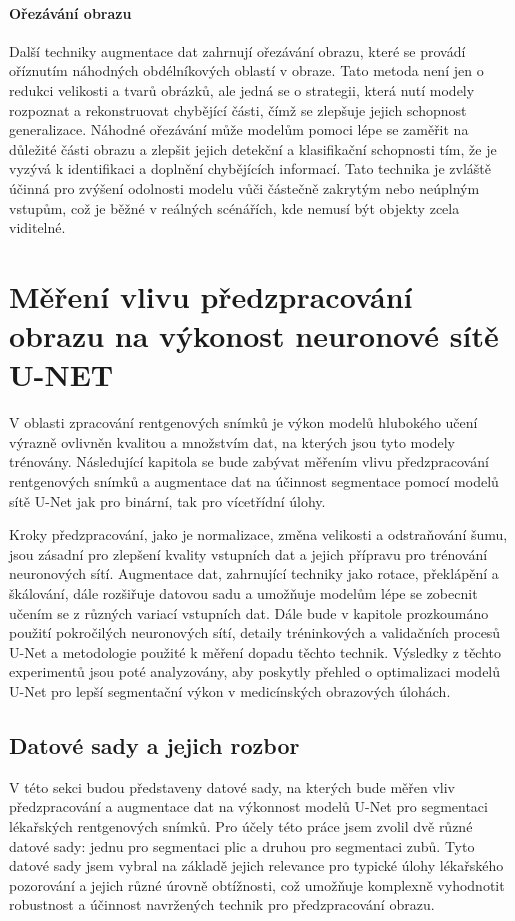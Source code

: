 \documentclass[male,czech,api_ing]{thesis}
\begin{document}
\subsubsection{Ořezávání obrazu}
Další techniky augmentace dat zahrnují ořezávání obrazu, které se provádí oříznutím náhodných obdélníkových oblastí v obraze. Tato metoda není jen o redukci velikosti a tvarů obrázků, ale jedná se o strategii, která nutí modely rozpoznat a rekonstruovat chybějící části, čímž se zlepšuje jejich schopnost generalizace. Náhodné ořezávání může modelům pomoci lépe se zaměřit na důležité části obrazu a zlepšit jejich detekční a klasifikační schopnosti tím, že je vyzývá k identifikaci a doplnění chybějících informací. Tato technika je zvláště účinná pro zvýšení odolnosti modelu vůči částečně zakrytým nebo neúplným vstupům, což je běžné v reálných scénářích, kde nemusí být objekty zcela viditelné. \cite{AugmentationSurvey}

\chapter{Měření vlivu předzpracování obrazu na výkonost neuronové sítě U-NET}
V oblasti zpracování rentgenových snímků je výkon modelů hlubokého učení výrazně ovlivněn kvalitou a množstvím dat, na kterých jsou tyto modely trénovány. Následující kapitola se bude zabývat měřením vlivu předzpracování rentgenových snímků a augmentace dat na účinnost segmentace pomocí modelů sítě U-Net jak pro binární, tak pro vícetřídní úlohy.

Kroky předzpracování, jako je normalizace, změna velikosti a odstraňování šumu, jsou zásadní pro zlepšení kvality vstupních dat a jejich přípravu pro trénování neuronových sítí. Augmentace dat, zahrnující techniky jako rotace, překlápění a škálování, dále rozšiřuje datovou sadu a umožňuje modelům lépe se zobecnit učením se z různých variací vstupních dat. Dále bude v kapitole prozkoumáno použití pokročilých neuronových sítí, detaily tréninkových a validačních procesů U-Net a metodologie použité k měření dopadu těchto technik. Výsledky z těchto experimentů jsou poté analyzovány, aby poskytly přehled o optimalizaci modelů U-Net pro lepší segmentační výkon v medicínských obrazových úlohách.

\section{Datové sady a jejich rozbor}
V této sekci budou představeny datové sady, na kterých bude měřen vliv předzpracování a augmentace dat na výkonnost modelů U-Net pro segmentaci lékařských rentgenových snímků. Pro účely této práce jsem zvolil dvě různé datové sady: jednu pro segmentaci plic a druhou pro segmentaci zubů. Tyto datové sady jsem vybral na základě jejich relevance pro typické úlohy lékařského pozorování a jejich různé úrovně obtížnosti, což umožňuje komplexně vyhodnotit robustnost a účinnost navržených technik pro předzpracování obrazu.
\end{document}
